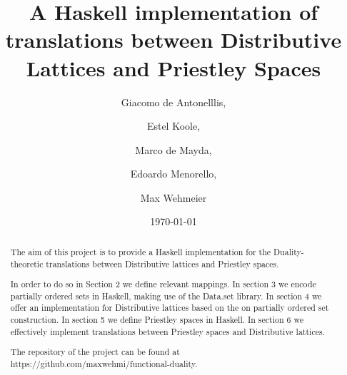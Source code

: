 \documentclass[12pt,a4paper]{article}
\title{A Haskell implementation of translations between Distributive Lattices and Priestley Spaces}
\author{Giacomo de Antonelllis, \and Estel Koole, \and Marco de Mayda, \and  Edoardo Menorello, \and  Max Wehmeier}
\date{\today}
\begin{document}
\maketitle


\begin{abstract}

The aim of this project is to provide a Haskell implementation for the Duality-theoretic translations between Distributive lattices and Priestley spaces.

In order to do so in Section 2 we define relevant mappings. In section 3 we encode partially ordered sets in Haskell, making use of the Data.set library. In section 4 we offer an implementation for Distributive lattices based on the on partially ordered set construction. In section 5 we define Priestley spaces in Haskell. In section 6 we effectively implement translations between Priestley spaces and Distributive lattices.





The repository of the project can be found at https://github.com/maxwehmi/functional-duality.
\end{abstract}


\tableofcontents

\clearpage

























\end{document}
